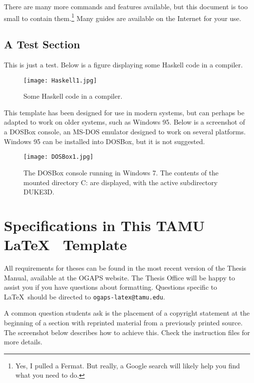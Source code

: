 There are many more commands and features available, but this document is too small to contain them.\footnote{Yes, I pulled a Fermat. But really, a Google search will likely help you find what you need to do.} Many guides are available on the Internet for your use.


\subsection{A Test Section}

This is just a test. Below is a figure displaying some Haskell code in a compiler.

\begin{figure}[!ht]
\centering
	\texttt{[image: Haskell1.jpg]}
	\caption{Some Haskell code in a compiler.}
\end{figure}

This template has been designed for use in modern systems, but can perhaps be adapted to work on older systems, such as Windows 95. Below is a screenshot of a DOSBox console, an MS-DOS emulator designed to work on several platforms. Windows 95 can be installed into DOSBox, but it is not suggested.

\begin{figure}[ht!]
\centering
	\texttt{[image: DOSBox1.jpg]}
	\caption{The DOSBox console running in Windows 7. The contents of the mounted directory C: are displayed, with the active subdirectory DUKE3D.}
\end{figure}

\section{Specifications in This TAMU \LaTeX ~ Template}

All requirements for theses can be found in the most recent version of the Thesis Manual, available at the OGAPS website. The Thesis Office will be happy to assist you if you have questions about formatting. Questions specific to \LaTeX\ should be directed to \texttt{ogaps-latex@tamu.edu}.

A common question students ask is the placement of a copyright statement at the beginning of a section with reprinted material from a previously printed source. The screenshot below describes how to achieve this. Check the instruction files for more details.

